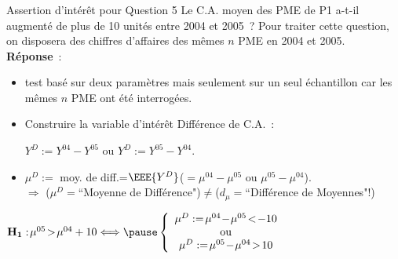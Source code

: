 \documentclass[11pt]{beamer}
\begin{document}
\begin{frame}
\frametitle{}

\begin{block}{Assertion d'intérêt pour Question 5}
{\small Le C.A. moyen des PME de P1 a-t-il augmenté de plus de 10 unités entre 2004 et 2005~?
Pour traiter cette question, on disposera des chiffres d'affaires des mêmes $n$ PME en 2004 et 2005.}\\
\pause
\textbf{Réponse}~:
\begin{itemize}
\item test basé sur deux paramètres mais seulement sur un seul échantillon car les mêmes $n$ PME ont été interrogées.
\item Construire la variable d'intérêt Différence de C.A.~:
\centerline{$Y^D:=Y^{04}-Y^{05}$ ou $Y^D:=Y^{05}-Y^{04}$.}
\item $\mu^D:=$ moy. de diff.=$\EEE{Y^D}$($=\mu^{04}-\mu^{05}$ ou $\mu^{05}-\mu^{04}$).\\\pause
$\Longrightarrow$ ($\mu^D=$``{\small Moyenne de Différence}")$\neq$($d_\mu=$``{\small Différence de Moyennes}"!) 
\end{itemize}
\centerline{$
\mathbf{H_1}: \!\mu^{05}\!>\! \mu^{04} +10 \Longleftrightarrow \pause \left\{\begin{array}{c} \mu^D:=\!\mu^{04}\!-\! \mu^{05} \!<\! -10 \\\mbox{ou}\\ \mu^D:=\!\mu^{05}\!-\! \mu^{04} \!>\! 10\end{array}\right.
$}
\end{block}
\end{frame}
\end{document}
